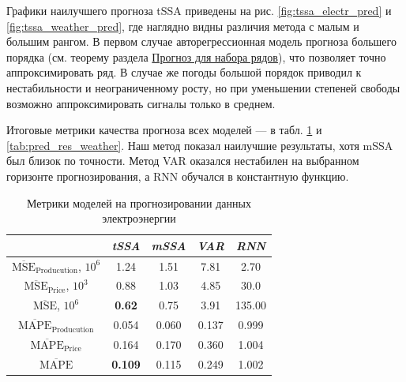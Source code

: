	Графики наилучшего прогноза tSSA приведены на рис. \ref{fig:tssa_electr_pred} и \ref{fig:tssa_weather_pred}, где наглядно видны различия метода с малым и большим рангом. В первом случае авторегрессионная модель прогноза большего порядка (см. теорему раздела \hyperref[sec:tssa_forecast]{Прогноз для набора рядов}), что позволяет точно аппроксимировать ряд. В случае же погоды большой порядок приводил к нестабильности и неограниченному росту, но при уменьшении степеней свободы возможно аппроксимировать сигналы только в среднем.
	
	Итоговые метрики качества прогноза всех моделей --- в табл. \ref{tab:pred_res_electr} и \ref{tab:pred_res_weather}. Наш метод показал наилучшие результаты, хотя mSSA был близок по точности. Метод VAR оказался нестабилен на выбранном горизонте прогнозирования, а RNN обучался в константную функцию.
	
	\def\arraystretch{1.1}
	\begin{table}[h]
		\centering
		\caption{Метрики моделей на прогнозировании данных электроэнергии}\label{tab:pred_res_electr}
		\begin{tabular}{|c|c|c|c|c|}
			\hline
			& \textit{tSSA}  & \textit{mSSA} & \textit{VAR} & \textit{RNN} \\ \hline
			$ \overline{\text{MSE}}_{\text{Producution}} $, $10^6$ & 1.24           & 1.51          & 7.81         & 2.70         \\ \hline
			$ \overline{\text{MSE}}_{\text{Price}} $, $10^3$      & 0.88           & 1.03          & 4.85         & 30.0         \\ \hline
			$ \overline{\text{MSE}} $, $10^6$             & \textbf{0.62}  & 0.75          & 3.91         & 135.00       \\ \hline
			$ \overline{\text{MAPE}}_{\text{Producution}} $        & 0.054          & 0.060         & 0.137        & 0.999        \\ \hline
			$ \overline{\text{MAPE}}_{\text{Price}} $             & 0.164          & 0.170         & 0.360        & 1.004        \\ \hline
			$ \overline{\text{MAPE}} $                    & \textbf{0.109} & 0.115         & 0.249        & 1.002        \\ \hline
		\end{tabular}
	\end{table}
	
